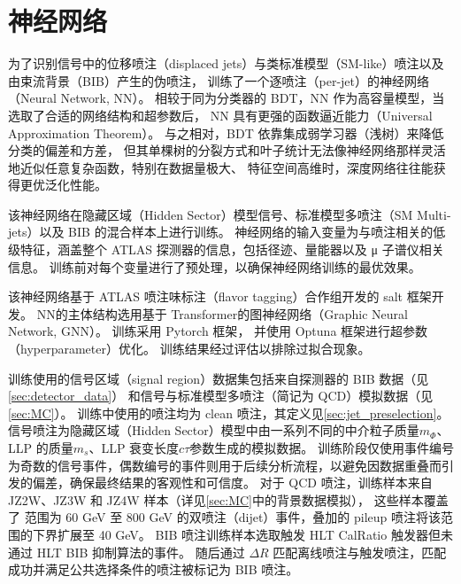 
\chapter{神经网络}
\label{chap:NN}

为了识别信号中的位移喷注（displaced jets）与类标准模型（SM-like）喷注以及由束流背景（BIB）产生的伪喷注，
训练了一个逐喷注（per-jet）的神经网络（Neural Network, NN）。
相较于同为分类器的 BDT，NN 作为高容量模型，当选取了合适的网络结构和超参数后，
NN 具有更强的函数逼近能力（Universal Approximation Theorem）。\cite{BRISCOE20112}
与之相对，BDT 依靠集成弱学习器（浅树）来降低分类的偏差和方差，
但其单棵树的分裂方式和叶子统计无法像神经网络那样灵活地近似任意复杂函数，特别在数据量极大、
特征空间高维时，深度网络往往能获得更优泛化性能。

该神经网络在隐藏区域（Hidden Sector）模型信号、标准模型多喷注（SM Multi-jets）以及 BIB 的混合样本上进行训练。
神经网络的输入变量为与喷注相关的低级特征，涵盖整个 ATLAS 探测器的信息，包括径迹、量能器以及 μ 子谱仪相关信息。
训练前对每个变量进行了预处理，以确保神经网络训练的最优效果。

该神经网络基于 ATLAS 喷注味标注（flavor tagging）合作组开发的 salt 框架\cite{ATL-PHYS-PUB-2022-027}开发。
NN的主体结构选用基于 Transformer\cite{vaswani2023attentionneed}的图神经网络（Graphic Neural Network, GNN）。
训练采用 Pytorch 框架\cite{paszke2019pytorchimperativestylehighperformance}，
并使用 Optuna 框架\cite{akiba2019optunanextgenerationhyperparameteroptimization}进行超参数（hyperparameter）优化。
训练结果经过评估以排除过拟合现象。

训练使用的信号区域（signal region）数据集包括来自探测器的 BIB 数据（见\autoref{sec:detector_data}）
和信号与标准模型多喷注（简记为 QCD）模拟数据（见\autoref{sec:MC}）。
训练中使用的喷注均为 clean 喷注，其定义见\autoref{sec:jet_preselection}。
信号喷注为隐藏区域（Hidden Sector）模型中由一系列不同的中介粒子质量$m_\Phi$、LLP 的质量$m_s$、LLP 衰变长度$c\tau$参数生成的模拟数据。
训练阶段仅使用事件编号为奇数的信号事件，偶数编号的事件则用于后续分析流程，以避免因数据重叠而引发的偏差，确保最终结果的客观性和可信度。
对于 QCD 喷注，训练样本来自 JZ2W、JZ3W 和 JZ4W 样本（详见\autoref{sec:MC}中的背景数据模拟），
这些样本覆盖了 \pt 范围为 60 GeV 至 800 GeV 的双喷注（dijet）事件，叠加的 pileup 喷注将该范围的下界扩展至 40 GeV。
BIB 喷注训练样本选取触发 HLT CalRatio 触发器但未通过 HLT BIB 抑制算法的事件。
随后通过 $\Delta R$ 匹配离线喷注与触发喷注，匹配成功并满足公共选择条件的喷注被标记为 BIB 喷注。

